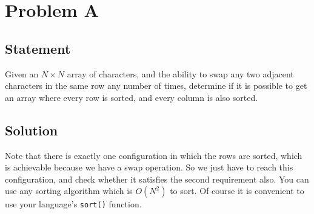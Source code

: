 \section{Problem A}
\subsection{Statement}
Given an $N \times N$ array of characters, and the ability to swap any two adjacent characters 
in the same row any number of times, determine if it is possible to get an array
where every row is sorted, and every column is also sorted.

\subsection{Solution}
Note that there is exactly one configuration in which the rows are sorted, which is achievable
because we have a swap operation. So we just have to reach this configuration, and check whether 
it satisfies the second requirement also.
You can use any sorting algorithm which is $O(N^2)$ to sort.
Of course it is convenient to use your language's \verb|sort()| function.